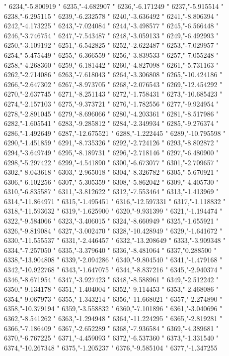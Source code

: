 "
6234,"-5.800919
"
6235,"-4.682907
"
6236,"-6.171249
"
6237,"-5.915514
"
6238,"-6.295115
"
6239,"-6.232578
"
6240,"-3.636492
"
6241,"-8.806394
"
6242,"-4.173225
"
6243,"-7.024084
"
6244,"-3.498577
"
6245,"-6.566448
"
6246,"-3.746754
"
6247,"-7.543487
"
6248,"-3.059133
"
6249,"-6.492993
"
6250,"-3.109192
"
6251,"-6.542825
"
6252,"-2.622487
"
6253,"-7.029957
"
6254,"-5.475449
"
6255,"-6.366559
"
6256,"-3.839533
"
6257,"-7.055248
"
6258,"-4.268360
"
6259,"-6.181442
"
6260,"-4.827098
"
6261,"-5.731163
"
6262,"-2.714086
"
6263,"-7.618043
"
6264,"-3.306808
"
6265,"-10.424186
"
6266,"-2.647302
"
6267,"-8.973705
"
6268,"-2.076543
"
6269,"-12.454292
"
6270,"-2.637745
"
6271,"-8.251143
"
6272,"-1.758431
"
6273,"-10.685423
"
6274,"-2.157103
"
6275,"-9.373721
"
6276,"-1.782556
"
6277,"-9.924954
"
6278,"-2.891045
"
6279,"-8.696066
"
6280,"-4.203361
"
6281,"-8.517986
"
6282,"-1.605541
"
6283,"-9.285812
"
6284,"-2.349934
"
6285,"-9.276374
"
6286,"-1.492649
"
6287,"-12.675521
"
6288,"-1.222445
"
6289,"-10.795598
"
6290,"-1.451859
"
6291,"-8.735326
"
6292,"-2.724126
"
6293,"-8.802872
"
6294,"-3.649749
"
6295,"-8.189731
"
6296,"-2.718146
"
6297,"-6.480900
"
6298,"-5.297422
"
6299,"-4.541890
"
6300,"-6.673077
"
6301,"-2.709657
"
6302,"-8.043618
"
6303,"-2.965018
"
6304,"-8.326782
"
6305,"-5.670921
"
6306,"-6.102256
"
6307,"-5.305359
"
6308,"-5.862042
"
6309,"-4.405730
"
6310,"-6.835587
"
6311,"-3.812622
"
6312,"-7.553464
"
6313,"-1.413969
"
6314,"-11.864971
"
6315,"-1.495451
"
6316,"-12.597331
"
6317,"-1.118832
"
6318,"-11.593632
"
6319,"-1.625900
"
6320,"-9.931399
"
6321,"-1.194474
"
6322,"-9.584066
"
6323,"-3.406015
"
6324,"-8.660949
"
6325,"-1.655921
"
6326,"-9.819084
"
6327,"-3.002470
"
6328,"-10.428949
"
6329,"-1.641672
"
6330,"-11.555537
"
6331,"-2.446457
"
6332,"-13.208649
"
6333,"-3.909348
"
6334,"-7.257050
"
6335,"-3.379640
"
6336,"-8.481064
"
6337,"0.288500
"
6338,"-13.904808
"
6339,"-2.094286
"
6340,"-9.804540
"
6341,"-1.479168
"
6342,"-10.922768
"
6343,"-1.647075
"
6344,"-8.837216
"
6345,"-2.940374
"
6346,"-8.671954
"
6347,"-3.927423
"
6348,"-8.588961
"
6349,"-2.512242
"
6350,"-9.134178
"
6351,"-1.404004
"
6352,"-9.114453
"
6353,"-2.468086
"
6354,"-9.067973
"
6355,"-1.343214
"
6356,"-11.668021
"
6357,"-2.274890
"
6358,"-10.379194
"
6359,"-3.558832
"
6360,"-7.101896
"
6361,"-3.040696
"
6362,"-8.541262
"
6363,"-1.294948
"
6364,"-11.224295
"
6365,"-2.819281
"
6366,"-7.186409
"
6367,"-2.652289
"
6368,"-7.936584
"
6369,"-4.389681
"
6370,"-6.767225
"
6371,"-4.459093
"
6372,"-6.537360
"
6373,"-1.331540
"
6374,"-10.267348
"
6375,"-1.205237
"
6376,"-9.585104
"
6377,"-1.347255

